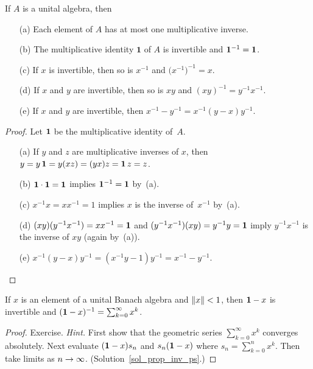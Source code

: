 \begin{prop}\label{prop_prop_inv}  If $A$ is a unital algebra, then
 \begin{enumerate}
   \item[(a)]  Each element of $A$ has at most one multiplicative inverse.
   \item[(b)]  The multiplicative identity $\boldsymbol 1$ of $A$ is invertible and $\mathbf{1}^{-1}
= \mathbf{1}$.
   \item[(c)]  If $x$ is invertible, then so is $x^{-1}$ and $\bigl(x^{-1}\bigr)^{-1} = x$.
   \item[(d)]  If $x$ and $y$ are invertible, then so is $xy$ and $(xy)^{-1} = y^{-1}x^{-1}$.
   \item[(e)]  If $x$ and $y$ are invertible, then $x^{-1} - y^{-1} = x^{-1}(y - x)y^{-1}$.
 \end{enumerate}
\end{prop}

\begin{proof}  Let $\mathbf{1}$ be the multiplicative identity of~$A$.
 \begin{enumerate}
   \item[(a)] If $y$ and $z$ are multiplicative inverses of $x$, then $y = y\,\mathbf{1} = y(xz)
= (yx)z = \mathbf{1}\,z = z$.
   \item[(b)] $\mathbf{1} \cdot \mathbf{1} = \mathbf{1}$ implies $\mathbf{1}^{-1} = \mathbf{1}$ by~(a).
   \item[(c)] $x^{-1}x = xx^{-1} = 1$ implies $x$ is the inverse of~$x^{-1}$ by~(a).
   \item[(d)] $(xy)(y^{-1}x^{-1}) = xx^{-1} = \mathbf{1}$ and $(y^{-1}x^{-1})(xy) = y^{-1}y =
\mathbf{1}$ imply $y^{-1}x^{-1}$ is the inverse of $xy$ (again by~(a)).
   \item[(e)] $x^{-1}(y - x)y^{-1} = (x^{-1}y - 1)y^{-1} = x^{-1} - y^{-1}$.
 \end{enumerate}
\end{proof}

\begin{prop}\label{prop_inv_ps} If $x$ is an element of a unital Banach algebra and $\lVert x\rVert < 1$,
then $\mathbf{1} - x$ is invertible and $(\mathbf{1} - x)^{-1} = \sum_{k=0}^\infty x^k$.
\end{prop}

\begin{proof} Exercise. \emph{Hint.}  First show that the geometric series $\sum_{k=0}^\infty x^k$
converges absolutely.  Next evaluate $(\mathbf{1} - x)s_n$ and $s_n(\mathbf{1} - x)$ where $s_n =
\sum_{k=0}^n x^k$.  Then take limits as $n \rightarrow \infty$.  (Solution~\ref{sol_prop_inv_ps}.)
\end{proof}

